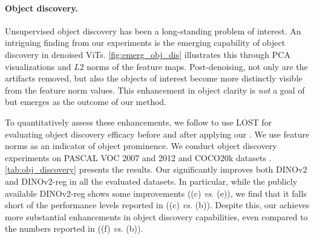 \paragraph{Object discovery.} Unsupervised object discovery has been a long-standing problem of interest. An intriguing finding from our experiments is the emerging capability of object discovery in denoised ViTs. \cref{fig:emerg_obj_dis} illustrates this through PCA visualizations and $L2$ norms of the feature maps. Post-denoising, not only are the artifacts removed, but also the objects of interest become more distinctly visible from the feature norm values. This enhancement in object clarity is \textit{not} a goal of \ours but emerges as the outcome of our method.

To quantitatively assess these enhancements, we follow \cite{darcet2023vision} to use LOST \cite{simeoni2021localizing} for evaluating object discovery efficacy before and after applying our \ours. We use feature norms as an indicator of object prominence. We conduct object discovery experiments on PASCAL VOC 2007 \cite{pascal-voc-2007} and 2012 \cite{pascal-voc-2012} and COCO20k datasets \cite{lin2014microsoft}.
\cref{tab:obj_discovery} presents the results. Our \ours significantly improves both DINOv2 \cite{oquab2023dinov2} and DINOv2-reg \cite{darcet2023vision} in all the evaluated datasets. In particular, while the publicly available DINOv2-reg shows some improvements ((c) \textit{vs.} (e)), we find that it falls short of the performance levels reported in \cite{darcet2023vision} ((c) \textit{vs.} (b)). Despite this, our \ours achieves more substantial enhancements in object discovery capabilities, even compared to the numbers reported in \cite{darcet2023vision} ((f) \textit{vs.} (b)).



